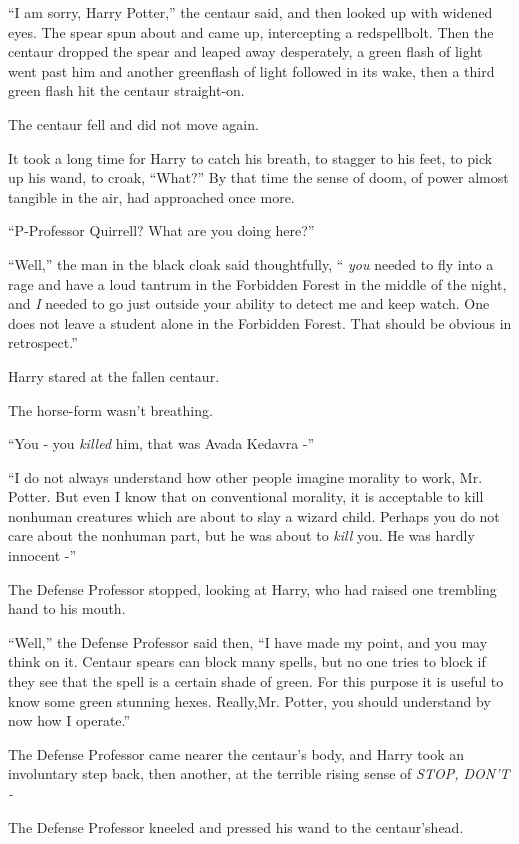 “I am sorry, Harry Potter,” the centaur said, and then looked up with widened eyes. The spear spun about and came up, intercepting a redspellbolt. Then the centaur dropped the spear and leaped away desperately, a green flash of light went past him and another greenflash of light followed in its wake, then a third green flash hit the centaur straight-on.

The centaur fell and did not move again.

It took a long time for Harry to catch his breath, to stagger to his feet, to pick up his wand, to croak, “What?”
By that time the sense of doom, of power almost tangible in the air, had approached once more.

“P-Professor Quirrell? What are you doing here?”

“Well,” the man in the black cloak said thoughtfully, “ \emph{you} needed to fly into a rage and have a loud tantrum in the Forbidden Forest in the middle of the night, and \emph{I} needed to go just outside your ability to detect me and keep watch. One does not leave a student alone in the Forbidden Forest. That should be obvious in retrospect.”

Harry stared at the fallen centaur.

The horse-form wasn't breathing.

“You - you \emph{killed} him, that was Avada Kedavra -”

“I do not always understand how other people imagine morality to work, Mr. Potter. But even I know that on conventional morality, it is acceptable to kill nonhuman creatures which are about to slay a wizard child. Perhaps you do not care about the nonhuman part, but he was about to \emph{kill} you. He was hardly innocent -”

The Defense Professor stopped, looking at Harry, who had raised one trembling hand to his mouth.

“Well,” the Defense Professor said then, “I have made my point, and you may think on it. Centaur spears can block many spells, but no one tries to block if they see that the spell is a certain shade of green. For this purpose it is useful to know some green stunning hexes. Really,Mr. Potter, you should understand by now how I operate.”

The Defense Professor came nearer the centaur's body, and Harry took an involuntary step back, then another, at the terrible rising sense of \emph{STOP, DON'T -}

The Defense Professor kneeled and pressed his wand to the centaur'shead.


